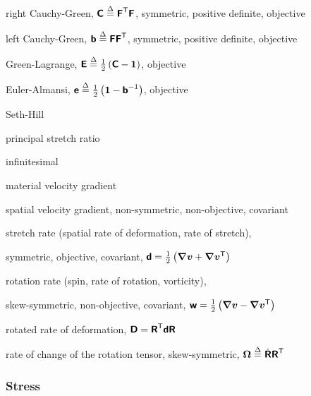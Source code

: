\begin{description}[noitemsep,align=right,labelwidth=1.5cm,labelsep=0.8cm]
\item [$\tCbold$] right Cauchy-Green, 
$\tCbold \defe \tFbold\transpose\tFbold$, symmetric, positive definite, objective
\item [$\tbbold$] left Cauchy-Green, 
$\tbbold \defe \tFbold \tFbold \transpose$, symmetric, positive definite, objective
\item 
\item [$\tEbold$] Green-Lagrange, 
$\tEbold \defe \half \left(\tCbold - \vid \right)$,
objective
\item [$\tebold$] Euler-Almansi,
$\tebold \defe \half \left(\vid - \tbbold\inverse \right)$,
objective
\item
\item [$\tEbold_{(m)}$] Seth-Hill
\item [$\lambda_I$] principal stretch ratio
\item
\item [$\ve{\epsilon}$] infinitesimal
\item
\item [$\dot{\tFbold}$] material velocity gradient
\item
\item [$\grad \vv$] spatial velocity gradient, non-symmetric, 
non-objective, covariant
\item 
\item [$\tdbold$] stretch rate (spatial rate of deformation, 
rate of stretch),
\item [] symmetric, objective, covariant,
$\tdbold = \half\left(\grad\vv + \grad\vv\transpose\right)$
\item
\item [$\twbold$] rotation rate (spin, rate of rotation, 
vorticity), 
\item [] skew-symmetric, non-objective, covariant,
$\twbold = \half\left(\grad\vv - \grad\vv\transpose\right)$
\item
\item [$\tDbold$] rotated rate of deformation,
$\tDbold = \tRbold\transpose \tdbold \tRbold$
\item [$\ve{\Omega}$] rate of change of the rotation tensor, skew-symmetric,
$\ve{\Omega} \defe \dot{\tRbold} \tRbold\transpose$
\end{description}

\subsubsection*{Stress}

